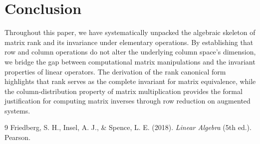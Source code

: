 \documentclass[12pt, a4paper]{article}
\theoremstyle{definition}
\theoremstyle{remark}
\begin{document}
\section{Conclusion}
Throughout this paper, we have systematically unpacked the algebraic skeleton of matrix rank and its invariance under elementary operations. By establishing that row and column operations do not alter the underlying column space's dimension, we bridge the gap between computational matrix manipulations and the invariant properties of linear operators. The derivation of the rank canonical form highlights that rank serves as the complete invariant for matrix equivalence, while the column-distribution property of matrix multiplication provides the formal justification for computing matrix inverses through row reduction on augmented systems.

\begin{thebibliography}{9}
    Friedberg, S. H., Insel, A. J., \& Spence, L. E. (2018). \textit{Linear Algebra} (5th ed.). Pearson.
\end{thebibliography}
\end{document}
